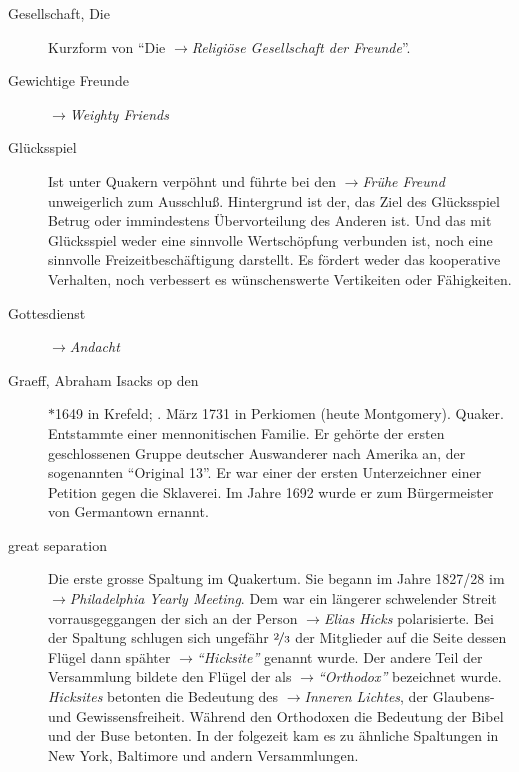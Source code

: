 \begin{description}
 \item[Gesellschaft, Die] Kurzform von "`Die
 $\to$\textit{Religiöse Gesellschaft der Freunde}"'.

\item[Gewichtige Freunde] $\to$\textit{Weighty Friends}

\item[Glücksspiel] Ist unter Quakern verpöhnt und führte bei den
$\to$\textit{Frühe Freund} unweigerlich zum Ausschluß. Hintergrund ist der,
das Ziel des Glücksspiel Betrug oder immindestens Übervorteilung des Anderen
ist. Und das mit Glücksspiel weder eine sinnvolle Wertschöpfung verbunden ist,
noch eine sinnvolle Freizeitbeschäftigung darstellt. Es fördert weder das
kooperative Verhalten, noch verbessert es wünschenswerte Vertikeiten oder
Fähigkeiten.

\item[Gottesdienst] $\to$\textit{Andacht}

 \item[Graeff, Abraham Isacks op den]  $\ast$1649 in Krefeld; . März 1731
 in Perkiomen (heute Montgomery). Quaker. Entstammte einer mennonitischen Familie.
Er gehörte der ersten geschlossenen Gruppe deutscher Auswanderer nach Amerika
an, der sogenannten "`Original 13"'. Er war einer der ersten Unterzeichner einer
Petition gegen die Sklaverei. Im Jahre 1692 wurde er zum Bürgermeister von
Germantown ernannt.

 \item[great separation] Die erste grosse Spaltung im Quakertum. Sie begann im
 Jahre 1827/28 im $\to$\textit{Philadelphia Yearly Meeting}. Dem war ein
 längerer schwelender Streit vorrausgeggangen der sich an der Person
 $\to$\textit{Elias Hicks} polarisierte. Bei der Spaltung schlugen sich
 ungefähr $\nicefrac{2}{3}$ der Mitglieder auf die Seite dessen Flügel dann
 spähter $\to$\textit{"`Hicksite"'} genannt wurde. Der andere Teil der
 Versammlung bildete den Flügel der als $\to$\textit{"`Orthodox"'} bezeichnet
 wurde. \textit{Hicksites} betonten die Bedeutung des $\to$\textit{Inneren
 Lichtes}, der Glaubens- und Gewissensfreiheit. Während den Orthodoxen die
 Bedeutung der Bibel und der Buse betonten. In der folgezeit kam es zu
 ähnliche Spaltungen in New York, Baltimore und andern Versammlungen.


\end{description}
